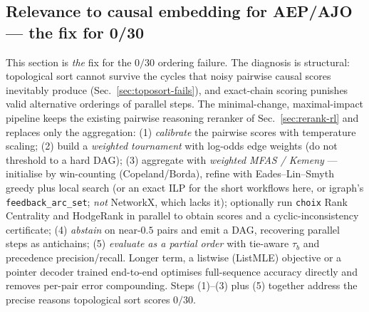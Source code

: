 \subsection{Relevance to causal embedding for AEP/AJO --- the fix for 0/30}
This section is \emph{the} fix for the $0/30$ ordering failure. The diagnosis is
structural: topological sort cannot survive the cycles that noisy pairwise causal
scores inevitably produce (Sec.~\ref{sec:toposort-fails}), and exact-chain scoring
punishes valid alternative orderings of parallel steps. The minimal-change,
maximal-impact pipeline keeps the existing pairwise reasoning reranker of
Sec.~\ref{sec:rerank-rl} and replaces only the aggregation: (1) \emph{calibrate}
the pairwise scores with temperature scaling; (2) build a \emph{weighted
tournament} with log-odds edge weights (do not threshold to a hard DAG);
(3) aggregate with \emph{weighted MFAS / Kemeny} --- initialise by win-counting
(Copeland/Borda), refine with Eades--Lin--Smyth greedy plus local search (or an
exact ILP for the short workflows here, or igraph's \texttt{feedback\_arc\_set};
\emph{not} NetworkX, which lacks it); optionally run \texttt{choix} Rank
Centrality and HodgeRank in parallel to obtain scores and a cyclic-inconsistency
certificate; (4) \emph{abstain} on near-$0.5$ pairs and emit a DAG, recovering
parallel steps as antichains; (5) \emph{evaluate as a partial order} with
tie-aware $\tau_b$ and precedence precision/recall. Longer term, a listwise
(ListMLE) objective or a pointer decoder trained end-to-end optimises full-sequence
accuracy directly and removes per-pair error compounding. Steps (1)--(3) plus (5)
together address the precise reasons topological sort scores $0/30$.
